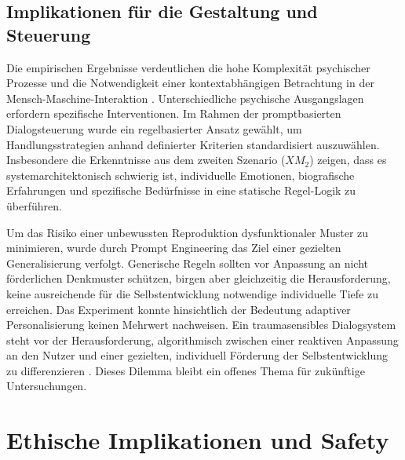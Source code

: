 \subsection{Implikationen für die Gestaltung und Steuerung}
Die empirischen Ergebnisse verdeutlichen die hohe Komplexität psychischer Prozesse und die Notwendigkeit einer kontextabhängigen Betrachtung in der 
Mensch-Maschine-Interaktion \citep{mai2020ai}. Unterschiedliche psychische Ausgangslagen erfordern spezifische 
Interventionen. Im Rahmen der promptbasierten Dialogsteuerung wurde ein 
regelbasierter Ansatz gewählt, um Handlungsstrategien anhand definierter Kriterien 
standardisiert auszuwählen. Insbesondere die Erkenntnisse aus dem zweiten Szenario 
($XM_2$) zeigen, dass es systemarchitektonisch schwierig ist, individuelle Emotionen, biografische Erfahrungen und 
spezifische Bedürfnisse in eine statische Regel-Logik zu überführen. 

Um das Risiko einer unbewussten Reproduktion dysfunktionaler Muster zu 
minimieren, wurde durch Prompt Engineering das Ziel einer gezielten 
Generalisierung verfolgt. Generische Regeln sollten vor Anpassung an nicht förderlichen 
Denkmuster schützen, birgen aber gleichzeitig die Herausforderung, keine ausreichende für die Selbstentwicklung 
notwendige individuelle Tiefe zu erreichen. Das Experiment konnte hinsichtlich der 
Bedeutung adaptiver Personalisierung keinen Mehrwert nachweisen. Ein 
traumasensibles Dialogsystem steht vor der Herausforderung, algorithmisch 
zwischen einer reaktiven Anpassung an den Nutzer und einer gezielten, 
individuell Förderung der Selbstentwicklung zu differenzieren \citep{strong2020chatbots,mai2023chatbots}. Dieses Dilemma bleibt ein offenes Thema für zukünftige Untersuchungen. 


\section{Ethische Implikationen und Safety}

